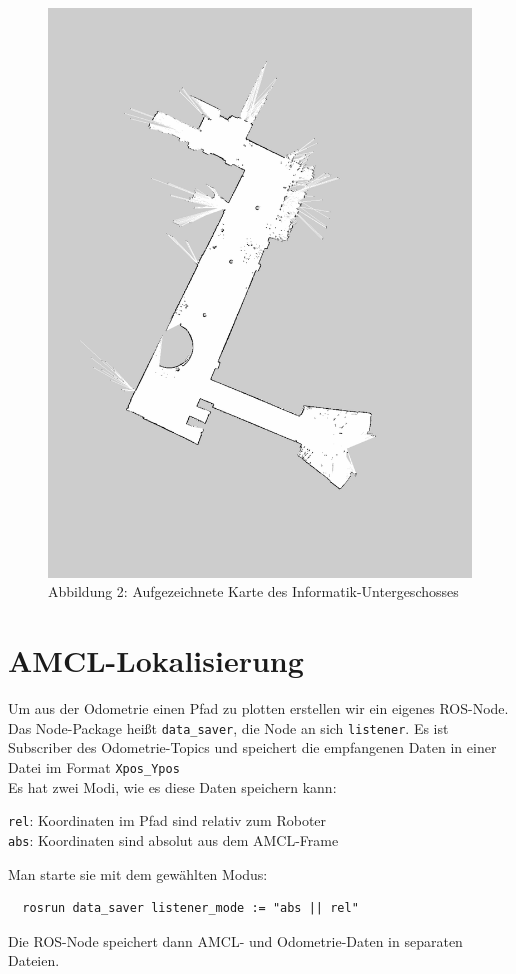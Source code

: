 \documentclass[11pt,a4paper]{article}
\begin{document}
\begin{figure}[H]
  \caption*{Abbildung 2: Aufgezeichnete Karte des Informatik-Untergeschosses}
  \includegraphics[scale = 0.3, angle = 90]{map.pdf}
  \centering
\end{figure}


\section{AMCL-Lokalisierung}
Um aus der Odometrie einen Pfad zu plotten erstellen wir ein eigenes ROS-Node. Das Node-Package heißt \verb|data_saver|, 
die Node an sich \texttt{listener}. Es ist Subscriber des Odometrie-Topics und speichert die empfangenen Daten 
in einer Datei im Format \verb|Xpos_Ypos| \\
Es hat zwei Modi, wie es diese Daten speichern kann:
\begin{center}
\texttt{rel}: Koordinaten im Pfad sind relativ zum Roboter \\
\texttt{abs}: Koordinaten sind absolut aus dem AMCL-Frame \\
\end{center}
Man starte sie mit dem gewählten Modus:
\begin{verbatim}
  rosrun data_saver listener_mode := "abs || rel"
\end{verbatim}
Die ROS-Node speichert dann AMCL- und Odometrie-Daten in separaten Dateien.
\end{document}
